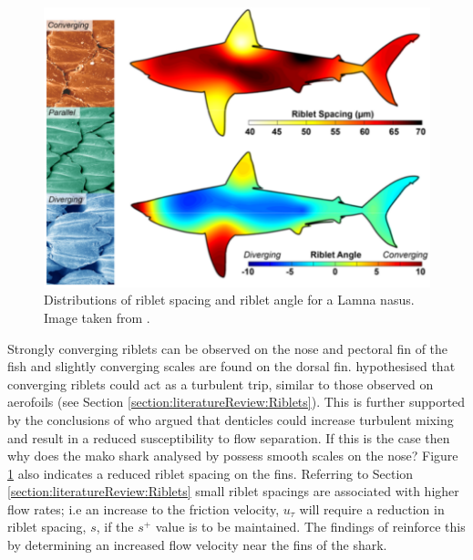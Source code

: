 \documentclass[12pt,oneside,a4paper]{article}
\begin{document}
\begin{figure}[!b]
\centering
\includegraphics[width=0.8\linewidth]{images/litReview/fletcherSharkMorphology.png}
\caption{Distributions of riblet spacing and riblet angle for a Lamna nasus. Image taken from \cite{fletcher2014phd}.}
\label{figure:litReview:fletcherMorphology}
\end{figure}
%
Strongly converging riblets can be observed on the nose and pectoral fin of the fish and slightly converging scales are found on the dorsal fin. \cite{fletcher2014phd} hypothesised that converging riblets could act as a turbulent trip, similar to those observed on aerofoils (see Section \ref{section:literatureReview:Riblets}). This is further supported by the conclusions of \cite{bechert1985} who argued that denticles could increase turbulent mixing and result in a reduced susceptibility to flow separation. If this is the case then why does the mako shark analysed by \cite{diez2015} possess smooth scales on the nose? Figure \ref{figure:litReview:fletcherMorphology} also indicates a reduced riblet spacing on the fins. Referring to Section \ref{section:literatureReview:Riblets} small riblet spacings are associated with higher flow rates; i.e an increase to the friction velocity, $u_\tau$ will require a reduction in riblet spacing, $s$, if the $s^+$ value is to be maintained. The findings of \cite{diez2015} reinforce this by determining an increased flow velocity near the fins of the shark. 
\end{document}
